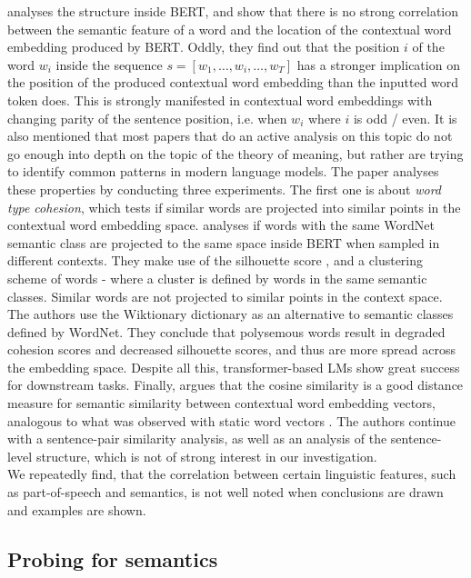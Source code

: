 \documentclass[a4paper,12pt,oneside,openright]{report}
\begin{document}
\cite{mickus19} analyses the structure inside BERT, and show that there is no strong correlation between the semantic feature of a word and the location of the contextual word embedding produced by BERT.
Oddly, they find out that the position $i$ of the word $w_i$ inside the sequence $s = [w_1, \ldots, w_i, \ldots, w_T]$ has a stronger implication on the position of the produced contextual word embedding than the inputted word token does.
This is strongly manifested in contextual word embeddings with changing parity of the sentence position, i.e. when $w_i$ where $i$ is odd / even.
It is also mentioned that most papers that do an active analysis on this topic do not go enough into depth on the topic of the theory of meaning, but rather are trying to identify common patterns in modern language models.
The paper analyses these properties by conducting three experiments.
The first one is about \textit{word type cohesion}, which tests if similar words are projected into similar points in the contextual word embedding space.
\cite{mickus19} analyses if words with the same WordNet semantic class are projected to the same space inside BERT when sampled in different contexts.
They make use of the silhouette score \cite{rousseeuw87}, and a clustering scheme of words - where a cluster is defined by words in the same semantic classes.
Similar words are not projected to similar points in the context space.
The authors use the Wiktionary dictionary \cite{wiktionary} as an alternative to semantic classes defined by WordNet.
They conclude that polysemous words result in degraded cohesion scores and decreased silhouette scores, and thus are more spread across the embedding space.
Despite all this, transformer-based LMs show great success for downstream tasks.
Finally, \cite{mickus19} argues that the cosine similarity is a good distance measure for semantic similarity between contextual word embedding vectors, analogous to what was observed with static word vectors \cite{mikolov13}.
The authors continue with a sentence-pair similarity analysis, as well as an analysis of the sentence-level structure, which is not of strong interest in our investigation. \\

We repeatedly find, that the correlation between certain linguistic features, such as part-of-speech and semantics, is not well noted when conclusions are drawn and examples are shown.

\subsection{Probing for semantics}
\end{document}
